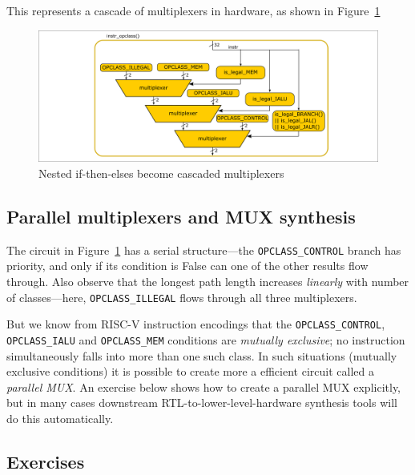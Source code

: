 This represents a cascade of multiplexers in hardware, as shown in
Figure~\ref{Fig_Combo_Multiplexer_Cascade}
\begin{figure}[htbp]
  \centerline{\includegraphics[width=6in,angle=0]{ch040_Combo_Circuits/Figures/Fig_Combo_Multiplexer_Cascade}}
  \caption{\label{Fig_Combo_Multiplexer_Cascade}Nested if-then-elses become cascaded multiplexers}
\end{figure}


\subsection{Parallel multiplexers and MUX synthesis}


The circuit in Figure~\ref{Fig_Combo_Multiplexer_Cascade} has a
serial structure---the \verb|OPCLASS_CONTROL| branch has priority, and
only if its condition is False can one of the other results flow
through.  Also observe that the longest path length increases
\emph{linearly} with number of classes---here, \verb|OPCLASS_ILLEGAL|
flows through all three multiplexers.

But we know from RISC-V instruction encodings that the
\verb|OPCLASS_CONTROL|, \verb|OPCLASS_IALU| and \verb|OPCLASS_MEM|
conditions are \emph{mutually exclusive}; no instruction
simultaneously falls into more than one such class.  In such
situations (mutually exclusive conditions) it is possible to create
more a efficient circuit called a \emph{parallel MUX}.  An exercise
below shows how to create a parallel MUX explicitly, but in many cases
downstream RTL-to-lower-level-hardware synthesis tools will do this
automatically.


\subsection{Exercises}

